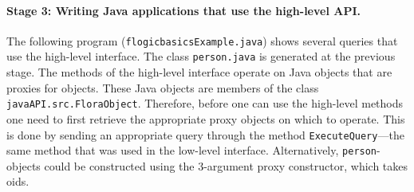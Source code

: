 \paragraph{Stage 3: Writing Java applications that use the high-level API.}

The following program ({\tt flogicbasicsExample.java}) shows several
queries that use the high-level interface. The
class {\tt person.java} is generated at the previous stage.
The methods of the high-level interface operate on Java objects that are
proxies for \FLSYSTEM objects. These Java objects are members of the class
{\tt javaAPI.src.FloraObject}.
Therefore, before one can use the high-level methods one need to first
retrieve the appropriate proxy objects on which to operate. This is done
by sending an appropriate query through the method {\tt ExecuteQuery}---the
same method that was used in the low-level interface.
Alternatively, {\tt person}-objects could be constructed using the
3-argument proxy constructor, which takes \fl oids.


